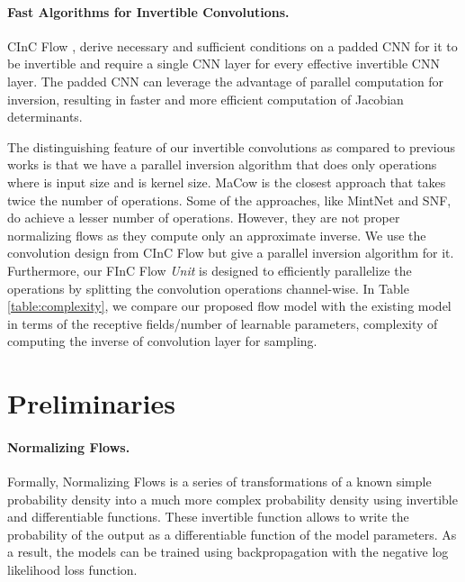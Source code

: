 \documentclass[a4paper,twoside]{article}
\theoremstyle{definition}
\begin{document}
\paragraph{Fast Algorithms for Invertible Convolutions.}
CInC Flow \citep{nagar2021cinc}, derive necessary and sufficient conditions on a padded CNN for it to be invertible and require a single CNN layer for every effective invertible CNN layer. The padded CNN can leverage the advantage of parallel computation for inversion, resulting in faster and more efficient computation of Jacobian determinants.

The distinguishing feature of our invertible convolutions as compared to previous works is that we have a parallel inversion algorithm that does only  operations where  is input size and  is kernel size. MaCow is the closest approach that takes twice the number of operations. Some of the approaches, like MintNet and SNF, do achieve a lesser number of operations. However, they are not proper normalizing flows as they compute only an approximate inverse. We use the convolution design from CInC Flow but give a parallel inversion algorithm for it. Furthermore, our FInC Flow \emph{Unit} is designed to efficiently parallelize the operations by splitting the convolution operations channel-wise. In Table \ref{table:complexity}, we compare our proposed flow model with the existing model in terms of the receptive fields/number of learnable parameters, complexity of computing the inverse of convolution layer for sampling.











%
 \section{Preliminaries}\label{sec:FastFlow}
\paragraph{Normalizing Flows.}
Formally, Normalizing Flows is a series of transformations of a known simple probability density into a much more complex probability density  using invertible and differentiable functions. These invertible function allows to write the probability of the output as a differentiable function of the model parameters. As a result, the models can be trained using backpropagation with the negative log likelihood loss function.
\end{document}
